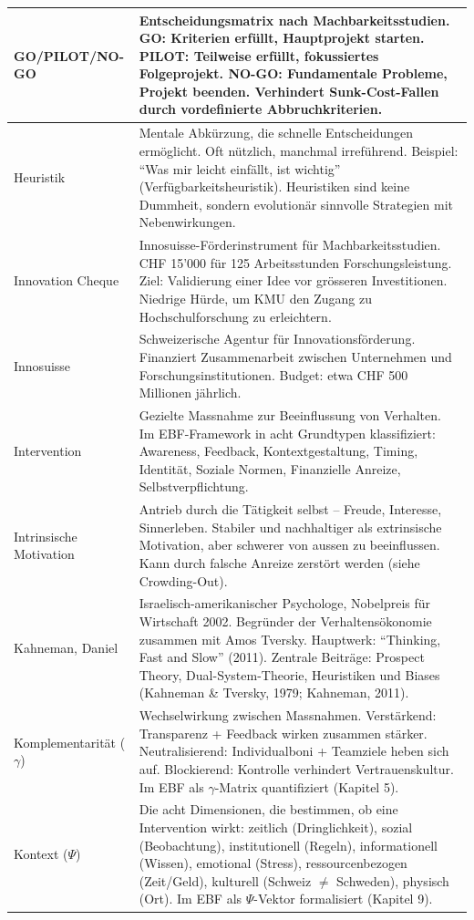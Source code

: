 \documentclass[11pt,a4paper]{article}
\begin{document}
\begin{longtable}{@{}L{4cm}L{10cm}@{}}
\midrule
GO/PILOT/NO-GO & Entscheidungsmatrix nach Machbarkeitsstudien. GO: Kriterien erfüllt, Hauptprojekt starten. PILOT: Teilweise erfüllt, fokussiertes Folgeprojekt. NO-GO: Fundamentale Probleme, Projekt beenden. Verhindert Sunk-Cost-Fallen durch vordefinierte Abbruchkriterien. \\
\midrule
Heuristik & Mentale Abkürzung, die schnelle Entscheidungen ermöglicht. Oft nützlich, manchmal irreführend. Beispiel: ``Was mir leicht einfällt, ist wichtig'' (Verfügbarkeitsheuristik). Heuristiken sind keine Dummheit, sondern evolutionär sinnvolle Strategien mit Nebenwirkungen. \\
\midrule
Innovation Cheque & Innosuisse-Förderinstrument für Machbarkeitsstudien. CHF 15'000 für 125 Arbeitsstunden Forschungsleistung. Ziel: Validierung einer Idee vor grösseren Investitionen. Niedrige Hürde, um KMU den Zugang zu Hochschulforschung zu erleichtern. \\
\midrule
Innosuisse & Schweizerische Agentur für Innovationsförderung. Finanziert Zusammenarbeit zwischen Unternehmen und Forschungsinstitutionen. Budget: etwa CHF 500 Millionen jährlich. \\
\midrule
Intervention & Gezielte Massnahme zur Beeinflussung von Verhalten. Im EBF-Framework in acht Grundtypen klassifiziert: Awareness, Feedback, Kontextgestaltung, Timing, Identität, Soziale Normen, Finanzielle Anreize, Selbstverpflichtung. \\
\midrule
Intrinsische Motivation & Antrieb durch die Tätigkeit selbst -- Freude, Interesse, Sinnerleben. Stabiler und nachhaltiger als extrinsische Motivation, aber schwerer von aussen zu beeinflussen. Kann durch falsche Anreize zerstört werden (siehe Crowding-Out). \\
\midrule
Kahneman, Daniel & Israelisch-amerikanischer Psychologe, Nobelpreis für Wirtschaft 2002. Begründer der Verhaltensökonomie zusammen mit Amos Tversky. Hauptwerk: ``Thinking, Fast and Slow'' (2011). Zentrale Beiträge: Prospect Theory, Dual-System-Theorie, Heuristiken und Biases (Kahneman \& Tversky, 1979; Kahneman, 2011). \\
\midrule
Komplementarität ($\gamma$) & Wechselwirkung zwischen Massnahmen. Verstärkend: Transparenz + Feedback wirken zusammen stärker. Neutralisierend: Individualboni + Teamziele heben sich auf. Blockierend: Kontrolle verhindert Vertrauenskultur. Im EBF als $\gamma$-Matrix quantifiziert (Kapitel 5). \\
\midrule
Kontext ($\Psi$) & Die acht Dimensionen, die bestimmen, ob eine Intervention wirkt: zeitlich (Dringlichkeit), sozial (Beobachtung), institutionell (Regeln), informationell (Wissen), emotional (Stress), ressourcenbezogen (Zeit/Geld), kulturell (Schweiz $\neq$ Schweden), physisch (Ort). Im EBF als $\Psi$-Vektor formalisiert (Kapitel 9). \\

\end{longtable}
\end{document}
